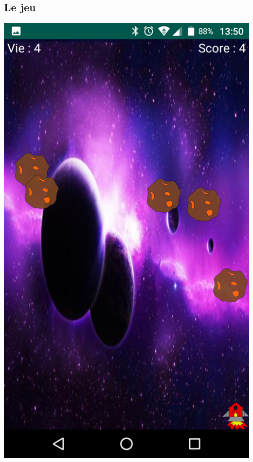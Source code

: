 \documentclass{article}
\begin{document}
\subsection{Le jeu}
\begin{minipage}[c]{.46\linewidth}
     \begin{center}
             \includegraphics[scale=0.2]{InGame.png}
         \end{center}
   \end{minipage} \hfill
\end{document}
